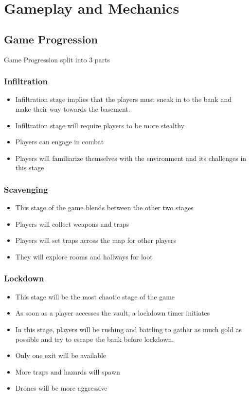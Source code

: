 \documentclass{report}
\begin{document}
\chapter{Gameplay and Mechanics}

\section{Game Progression}
Game Progression split into 3 parts

\subsection{Infiltration}
\begin{itemize}
    \item Infiltration stage implies that the players must sneak in to the bank and make their way towards the basement.
    \item Infiltration stage will require players to be more stealthy
    \item Players can engage in combat
    \item Players will familiarize themselves with the environment and its challenges in this stage
\end{itemize}
\subsection{Scavenging}
\begin{itemize}
    \item This stage of the game blends between the other two stages
    \item Players will collect weapons and traps
    \item Players will set traps across the map for other players
    \item They will explore rooms and hallways for loot 
\end{itemize}
\subsection{Lockdown}
\begin{itemize}
    \item This stage will be the most chaotic stage of the game
    \item As soon as a player accesses the vault, a lockdown timer initiates
    \item In this stage, players will be rushing and battling to gather as much gold as possible and try to escape the bank before lockdown.
    \item Only one exit will be available
    \item More traps and hazards will spawn
    \item Drones will be more aggressive
\end{itemize}
\end{document}
